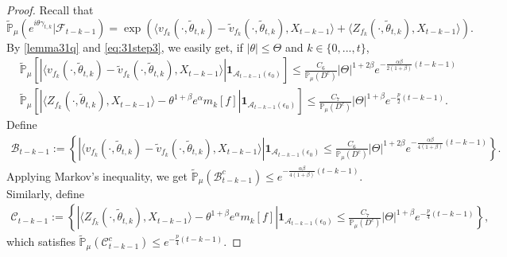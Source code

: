\documentclass[12pt,oneside,english]{amsart}
\theoremstyle{plain}
\theoremstyle{definition}
\numberwithin{equation}{section}
\begin{document}
\begin{proof}
    Recall that
    $$\mathbb{\tilde{P}}_{\mu}\left(e^{i\theta \gamma_{t,k}}|\mathscr{F}_{t-k-1}\right)=\exp(\langle v_{f_k}(\cdot,\tilde{\theta}_{t,k})-\tilde{v}_{f_k}(\cdot, \tilde{\theta}_{t,k}),X_{t-k-1}\rangle+\langle Z_{f_k}(\cdot,\tilde{\theta}_{t,k}),X_{t-k-1}\rangle).$$
 By \eqref{lemma31q} and \eqref{eq:31step3}, we easily get, if $|\theta|\leq\Theta$ and $k\in\{0,...,t\}$,
    \begin{align*}
        &\mathbb{\tilde{P}}_{\mu}\left[\left|\langle v_{f_k}(\cdot,\tilde{\theta}_{t,k})-\tilde{v}_{f_k}(\cdot,\tilde{\theta}_{t,k}), X_{t-k-1}\rangle\right|\mathbf{1}_{\mathcal{A}_{t-k-1}(\epsilon_0)}\right]\leq \frac{C_{6}}{\mathbb{P}_{\mu}(D^c)}|\Theta|^{1+2\beta} e^{-\frac{\alpha\beta}{2(1+\beta)}(t-k-1)}\\
        &\mathbb{\tilde{P}}_{\mu}\left[\left|\langle Z_{f_k}(\cdot,\tilde{\theta}_{t,k}),X_{t-k-1}\rangle-\theta^{1+\beta}e^{\alpha}m_k[f]\right|\mathbf{1}_{\mathcal{A}_{t-k-1}(\epsilon_0)}\right]\leq \frac{C_{7}}{\mathbb{P}_{\mu}(D^c)}|\Theta|^{1+\beta} e^{-\frac{p}{2}(t-k-1)}.
    \end{align*}
 Define
\begin{align*}
    \mathcal{B}_{t-k-1}:=\left\{\left|\langle v_{f_k}(\cdot,\tilde{\theta}_{t,k})-\tilde{v}_{f_k}(\cdot,\tilde{\theta}_{t,k}), X_{t-k-1}\rangle\right|\mathbf{1}_{\mathcal{A}_{t-k-1}(\epsilon_0)}\leq\frac{C_{6}}{\mathbb{P}_{\mu}(D^c)}|\Theta|^{1+2\beta} e^{-\frac{\alpha\beta}{4(1+\beta)}(t-k-1)}\right\}.
\end{align*}
Applying Markov's inequality, we get $\mathbb{\tilde{P}}_{\mu}(\mathcal{B}^c_{t-k-1})\leq e^{-\frac{\alpha\beta}{4(1+\beta)}(t-k-1)}$. Similarly, define
\begin{align*}
    \mathcal{C}_{t-k-1}:=\left\{\left|\langle Z_{f_k}(\cdot,\tilde{\theta}_{t,k}),X_{t-k-1}\rangle-\theta^{1+\beta}e^{\alpha}m_k[f]\right|\mathbf{1}_{\mathcal{A}_{t-k-1}(\epsilon_0)}\leq \frac{C_{7}}{\mathbb{P}_{\mu}(D^c)}|\Theta|^{1+\beta} e^{-\frac{p}{4}(t-k-1)}\right\},
\end{align*}
 which satisfies  $\mathbb{\tilde{P}}_{\mu}(\mathcal{C}^c_{t-k-1})\leq e^{-\frac{p}{4}(t-k-1)}$.


\end{proof}
\end{document}
